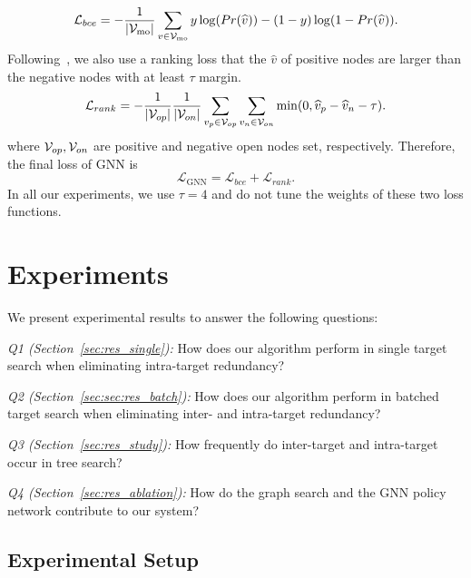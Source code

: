\documentclass[sigconf]{acmart}
\begin{document}
\begin{equation}
    \mathcal{L}_{bce} = - \frac{1}{|\mathcal{V}_{\text{mo}}|}\sum_{v\in\mathcal{V}_{\text{mo}}} y \log(Pr(\widehat{v})) - (1-y)\log(1-Pr(\widehat{v})).
\end{equation}
Following~\citet{Chen2020}, we also use a ranking loss that the $\widehat{v}$ of positive nodes are larger than the negative nodes with at least $\tau$ margin.
\begin{equation}
    \mathcal{L}_{rank} = -\frac{1}{|\mathcal{V}_{op}|}\frac{1}{|\mathcal{V}_{on}|}\sum_{v_p \in \mathcal{V}_{op} }\sum_{v_n \in \mathcal{V}_{on}} \min(0, \widehat{v}_p - \widehat{v}_n - \tau).
\end{equation}
where $\mathcal{V}_{op}, \mathcal{V}_{on}$ are positive and negative open nodes set, respectively.
Therefore, the final loss of GNN is 
\begin{equation}
    \mathcal{L}_{\text{GNN}} = \mathcal{L}_{bce} + \mathcal{L}_{rank}.
\end{equation}
In all our experiments, we use $\tau = 4$ and do not tune the weights of these two loss functions.



\section{Experiments}
We present experimental results to answer the following questions:

\noindent\textit{Q1 (Section~\ref{sec:res_single}):} How does our algorithm perform in single target search when eliminating intra-target redundancy?

\noindent\textit{Q2 (Section~\ref{sec:sec:res_batch}):} How does our algorithm perform in batched target search when eliminating inter- and intra-target redundancy?

\noindent\textit{Q3 (Section~\ref{sec:res_study}):} How frequently do inter-target and intra-target occur in tree search?

\noindent\textit{Q4 (Section~\ref{sec:res_ablation}):} 
How do the graph search and the GNN policy network contribute to our system?


\subsection{Experimental Setup}\label{sec:exp_setup}
\end{document}
